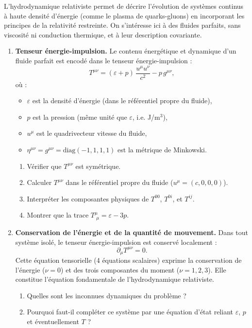 \documentclass[a4paper,10pt]{report}
\begin{document}
L’hydrodynamique relativiste permet de décrire l’évolution de systèmes continus à haute densité d’énergie (comme le plasma de quarks-gluons) en incorporant les principes de la relativité restreinte. On s'intéresse ici à des fluides parfaits, sans viscosité ni conduction thermique, et à leur description covariante.

\begin{enumerate}
	\item \textbf{Tenseur énergie-impulsion.} Le contenu énergétique et dynamique d’un fluide parfait est encodé dans le tenseur énergie-impulsion :
	\[
	T^{\mu\nu} = (\varepsilon + p)\, \frac {u^\mu u^\nu}{c^2}- p\, g^{\mu\nu},
	\]
	où :
	\begin{itemize}
		\item \( \varepsilon \) est la densité d’énergie (dans le référentiel propre du fluide),
		\item \( p \) est la pression (même unité que \( \varepsilon \), i.e. J/m$^3$),
		\item \( u^\mu \) est le quadrivecteur vitesse du fluide,
		\item \( \eta^{\mu\nu} = g^{\mu \nu} = \mathrm{diag}(-1, 1, 1, 1) \) est la métrique de Minkowski.
	\end{itemize}
	
	\begin{enumerate}
		\item Vérifier que \( T^{\mu\nu} \) est symétrique.
		\item Calculer \( T^{\mu\nu} \) dans le référentiel propre du fluide (\( u^\mu = (c, 0, 0, 0) \)).
		\item Interpréter les composantes physiques de \( T^{00} \), \( T^{0i} \), et \( T^{ij} \).
		\item Montrer que la trace \( T^\mu_{\,\,\mu} = \varepsilon - 3p \).
	\end{enumerate}
	
	\item \textbf{Conservation de l’énergie et de la quantité de mouvement.} Dans tout système isolé, le tenseur énergie-impulsion est conservé localement :
	\[
	\partial_\mu T^{\mu\nu} = 0.
	\]
	Cette équation tensorielle (4 équations scalaires) exprime la conservation de l’énergie (\( \nu=0 \)) et des trois composantes du moment (\( \nu=1,2,3 \)). Elle constitue l’équation fondamentale de l’hydrodynamique relativiste.
	
	\begin{enumerate}
		\item Quelles sont les inconnues dynamiques du problème ?
		\item Pourquoi faut-il compléter ce système par une équation d’état reliant \( \varepsilon \), \( p \) et éventuellement \( T \) ?
	\end{enumerate}
	

\end{enumerate}
\end{document}
